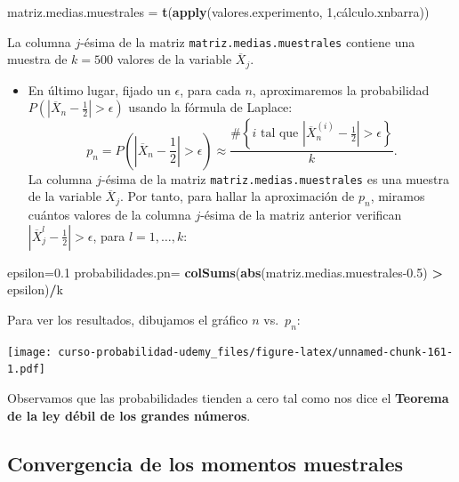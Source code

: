 \documentclass[]{book}
\newenvironment{Shaded}{\begin{snugshade}}{\end{snugshade}}
\newcommand{\DecValTok}[1]{\textcolor[rgb]{0.00,0.00,0.81}{#1}}
\newcommand{\FloatTok}[1]{\textcolor[rgb]{0.00,0.00,0.81}{#1}}
\newcommand{\KeywordTok}[1]{\textcolor[rgb]{0.13,0.29,0.53}{\textbf{#1}}}
\newcommand{\NormalTok}[1]{#1}
\newcommand{\OperatorTok}[1]{\textcolor[rgb]{0.81,0.36,0.00}{\textbf{#1}}}
\newcommand{\StringTok}[1]{\textcolor[rgb]{0.31,0.60,0.02}{#1}}
\providecommand{\tightlist}{%
  \setlength{\itemsep}{0pt}\setlength{\parskip}{0pt}}
\begin{document}
\begin{Shaded}
\begin{Highlighting}[]
\NormalTok{matriz.medias.muestrales =}\StringTok{ }\KeywordTok{t}\NormalTok{(}\KeywordTok{apply}\NormalTok{(valores.experimento,}
                                   \DecValTok{1}\NormalTok{,cálculo.xnbarra))}
\end{Highlighting}
\end{Shaded}

La columna \(j\)-ésima de la matriz \texttt{matriz.medias.muestrales} contiene una muestra de \(k=500\) valores de la variable \(\overline{X}_j\).

\begin{itemize}
\tightlist
\item
  En último lugar, fijado un \(\epsilon\), para cada \(n\), aproximaremos la probabilidad \(P\left(\left|\overline{X}_n-\frac{1}{2}\right|>\epsilon\right)\) usando la fórmula de Laplace:
  \[
  p_n=P\left(\left|\overline{X}_n-\frac{1}{2}\right|>\epsilon\right) \approx\frac{\#\left\{\mbox{$i$ tal que  $\left|\overline{X}_n^{(i)}-\frac{1}{2}\right|>\epsilon$}\right\}}{k}.
  \]
  La columna \(j\)-ésima de la matriz \texttt{matriz.medias.muestrales} es una muestra de la variable \(\overline{X}_j\). Por tanto, para hallar la aproximación de \(p_n\), miramos cuántos valores de la columna \(j\)-ésima de la matriz anterior verifican \(\left|\overline{X}_j^{l}-\frac{1}{2}\right|>\epsilon\), para \(l=1,\ldots, k\):
\end{itemize}

\begin{Shaded}
\begin{Highlighting}[]
\NormalTok{epsilon=}\FloatTok{0.1}
\NormalTok{probabilidades.pn=}\StringTok{ }\KeywordTok{colSums}\NormalTok{(}\KeywordTok{abs}\NormalTok{(matriz.medias.muestrales}\FloatTok{-0.5}\NormalTok{) }\OperatorTok{>}\StringTok{ }\NormalTok{epsilon)}\OperatorTok{/}\NormalTok{k}
\end{Highlighting}
\end{Shaded}

Para ver los resultados, dibujamos el gráfico \(n\) vs.~\(p_n\):

\texttt{[image: curso-probabilidad-udemy\_files/figure-latex/unnamed-chunk-161-1.pdf]}

Observamos que las probabilidades tienden a cero tal como nos dice el \textbf{Teorema de la ley débil de los grandes números}.

\hypertarget{convergencia-de-los-momentos-muestrales}{%
\subsection{Convergencia de los momentos muestrales}\label{convergencia-de-los-momentos-muestrales}}
\end{document}
